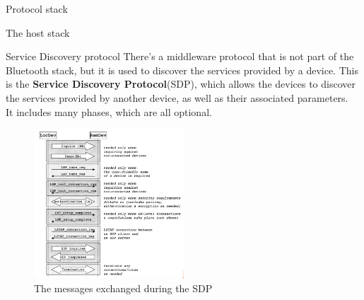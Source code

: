 \begin{section}{Protocol stack}
\begin{subsection}{The host stack}
  \end{subsection}
  \begin{subsection}{Service Discovery protocol}
    There's a middleware protocol that is not part of the Bluetooth stack, but it is used to discover
    the services provided by a device. This is the \textbf{Service Discovery Protocol}(SDP), which
    allows the devices to discover the services provided by another device, as well as their 
    associated parameters.\\
    It includes many phases, which are all optional.
    \begin{figure}[H]
      \centering
      \includegraphics[width=0.5\textwidth]{img/wireless/bluetooth sdp.png}
      \caption{The messages exchanged during the SDP}
    \end{figure}
  \end{subsection}


\end{section}
